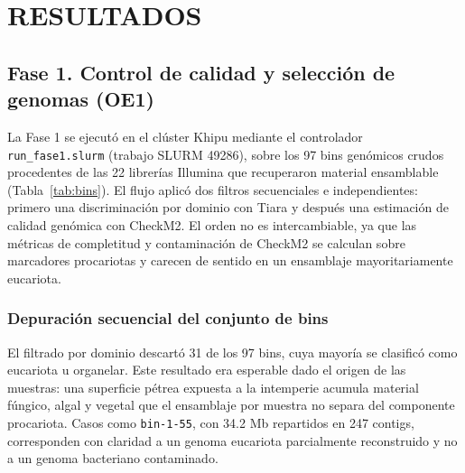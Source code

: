 \chapter{RESULTADOS}

%

\section{Fase 1. Control de calidad y selección de genomas (OE1)}

La Fase 1 se ejecutó en el clúster Khipu mediante el controlador
\texttt{run\_fase1.slurm} (trabajo SLURM 49286), sobre los 97 bins genómicos
crudos procedentes de las 22 librerías Illumina que recuperaron material
ensamblable (Tabla~\ref{tab:bins}). El flujo aplicó dos filtros secuenciales e
independientes: primero una discriminación por dominio con Tiara y después una
estimación de calidad genómica con CheckM2. El orden no es intercambiable, ya
que las métricas de completitud y contaminación de CheckM2 se calculan sobre
marcadores procariotas y carecen de sentido en un ensamblaje
mayoritariamente eucariota.

\subsection{Depuración secuencial del conjunto de bins}

El filtrado por dominio descartó 31 de los 97 bins, cuya mayoría se
clasificó como eucariota u organelar. Este resultado era esperable dado el
origen de las muestras: una superficie pétrea expuesta a la intemperie acumula
material fúngico, algal y vegetal que el ensamblaje por muestra no separa del
componente procariota. Casos como \texttt{bin-1-55}, con 34.2 Mb repartidos en
247 contigs, corresponden con claridad a un genoma eucariota parcialmente
reconstruido y no a un genoma bacteriano contaminado.

